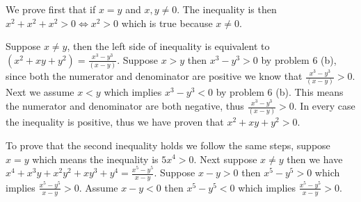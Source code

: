 \begin{problem} %
\end{problem}

\begin{hproblem} %
	We prove first that if $x=y$ and $x,y\neq 0$. The inequality is then $x^2+x^2+x^2>0 \iff x^2 >0$ which is true because $x\neq 0$.
	
	Suppose $x\neq y$, then the left side of inequality is equivalent to $(x^2+xy+y^2)=\frac{x^3-y^3}{(x-y)}$. Suppose $x>y$ then $x^3-y^3>0$ by problem 6 (b),  since both the numerator and denominator are positive we know that $\frac{x^3-y^3}{(x-y)}>0$. Next we assume $x < y$ which implies $x^3-y^3 < 0$ by problem 6 (b). This means the numerator and denominator are both negative, thus $\frac{x^3-y^3}{(x-y)}>0$. In every case the inequality is positive, thus we have proven that $x^2+xy+y^2>0$.
	
	To prove that the second inequality holds we follow the same steps, suppose $x=y$ which means the inequality is $5x^4>0$. Next suppose $x\neq y$ then we have $x^4+x^3y+x^2y^2+xy^3+y^4=\frac{x^5-y^5}{x-y}$. Suppose $x-y>0$ then $x^5-y^5>0$ which implies $\frac{x^5-y^5}{x-y}>0$. Assume $x-y<0$ then $x^5-y^5<0$ which implies $\frac{x^5-y^5}{x-y}>0$.
\end{hproblem}

